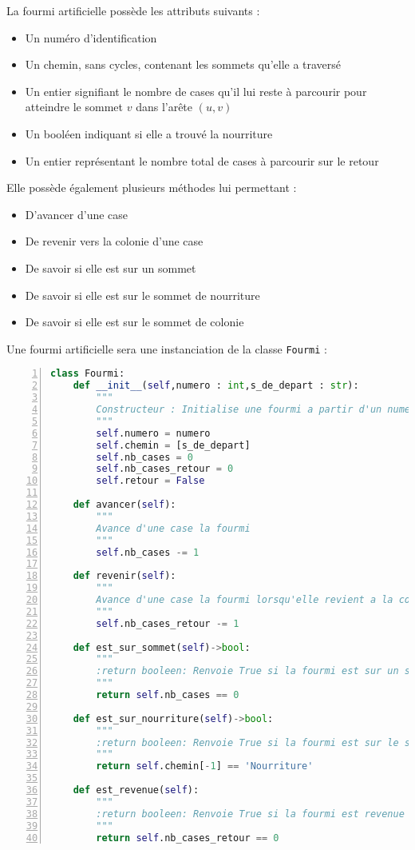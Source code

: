 \documentclass[
12pt,
french,
]{article}
\newcommand{\passthrough}[1]{#1}
\begin{document}
La fourmi artificielle possède les attributs suivants :

\begin{itemize}
\item
  Un numéro d'identification
\item
  Un chemin, sans cycles, contenant les sommets qu'elle a traversé
\item
  Un entier signifiant le nombre de cases qu'il lui reste à parcourir
  pour atteindre le sommet \(v\) dans l'arête \((u,v)\)
\item
  Un booléen indiquant si elle a trouvé la nourriture
\item
  Un entier représentant le nombre total de cases à parcourir sur le
  retour
\end{itemize}

Elle possède également plusieurs méthodes lui permettant :

\begin{itemize}
\item
  D'avancer d'une case
\item
  De revenir vers la colonie d'une case
\item
  De savoir si elle est sur un sommet
\item
  De savoir si elle est sur le sommet de nourriture
\item
  De savoir si elle est sur le sommet de colonie
\end{itemize}

Une fourmi artificielle sera une instanciation de la classe
\passthrough{\lstinline!Fourmi!} :

\begin{lstlisting}[language=Python, numbers=left, caption={Classe Fourmi}]
class Fourmi:
    def __init__(self,numero : int,s_de_depart : str):
        """
        Constructeur : Initialise une fourmi a partir d'un numero de fourmi et d'un sommet de depart
        """
        self.numero = numero
        self.chemin = [s_de_depart]
        self.nb_cases = 0
        self.nb_cases_retour = 0
        self.retour = False

    def avancer(self):
        """
        Avance d'une case la fourmi
        """
        self.nb_cases -= 1

    def revenir(self):
        """
        Avance d'une case la fourmi lorsqu'elle revient a la colonie
        """
        self.nb_cases_retour -= 1

    def est_sur_sommet(self)->bool:
        """
        :return booleen: Renvoie True si la fourmi est sur un sommet, False sinon
        """
        return self.nb_cases == 0

    def est_sur_nourriture(self)->bool:
        """
        :return booleen: Renvoie True si la fourmi est sur le sommet de nourriture, False sinon
        """
        return self.chemin[-1] == 'Nourriture'

    def est_revenue(self):
        """
        :return booleen: Renvoie True si la fourmi est revenue a la colonie, False sinon
        """
        return self.nb_cases_retour == 0
\end{lstlisting}
\end{document}

